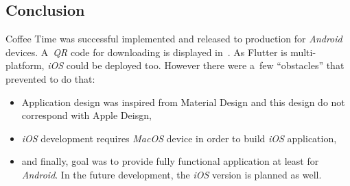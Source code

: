 \subsection{Conclusion}
Coffee Time was successful implemented and released to production for \textit{Android} devices. A~\textit{QR} code for downloading is displayed in~. As Flutter is multi-platform, \textit{iOS} could be deployed too. However there were a~few ``obstacles'' that prevented to do that:

\begin{itemize}
    \item Application design was inspired from Material Design and this design do not correspond with Apple Deisgn,
    \item \textit{iOS} development requires \textit{MacOS} device in order to build \textit{iOS} application,
    \item and finally, goal was to provide fully functional application at least for \textit{Android}. In the future development, the \textit{iOS} version is planned as well. 
\end{itemize}